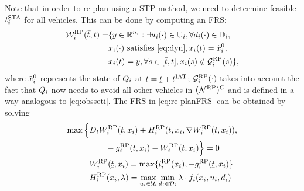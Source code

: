 Note that in order to re-plan using a STP method, we need to determine feasible $t^\text{STA}_i$ for all vehicles. This can be done by computing an FRS:
\begin{equation} \label{eq:re-planFRS}
\begin{aligned} 
\frs_i^{\text{RP}}(\tea, t) = & \{y \in \R^{n_i}: \exists \ctrl_i(\cdot) \in \cfset_i, \forall \dstb_i(\cdot) \in \dfset_i, \\
& \state_i(\cdot) \text{ satisfies \eqref{eq:dyn}}, \state_i(\tea) = \tilde{\state}_i^0, \\
& \state_i(t) = y, \forall s \in [\tea, t], \state_i(s) \notin \obsset_i^{\text{RP}}(s) \},
\end{aligned}
\end{equation}
\noindent where $\tilde{x}_i^0$ represents the state of $Q_i$ at $t = \underline{t}+t^\text{IAT}$; $\mathcal{G}_i^{\text{RP}}(\cdot)$ takes into account the fact that $Q_i$ now needs to avoid all other vehicles in $(\mathcal{N}^\text{RP})^C$ and is defined in a way analogous to \eqref{eq:obsseti}. The FRS in \eqref{eq:re-planFRS} can be obtained by solving %
\begin{equation}
\begin{aligned}
\max \Big\{&D_t W_i^{\text{RP}}(t, x_i) + H_i^{\text{RP}}(t, x_i, \nabla W_i^{\text{RP}}(t, x_i)), \\
&\qquad - g_i^{\text{RP}}(t, x_i) - W_i^{\text{RP}}(t, x_i) \Big\} = 0\\
&W_i^{\text{RP}}(\underline{t}, x_i) = \max\{l_i^{\text{RP}}(x_i), -g_i^{\text{RP}}(\underline{t}, x_i)\} \\
&H_i^{\text{RP}}(x_i, \lambda) = \max_{u_i \in \mathcal{U}_i} \min_{d_i \in \mathcal{D}_i} \lambda \cdot f_i (x_i, u_i, d_i)
\end{aligned}
\end{equation} 

